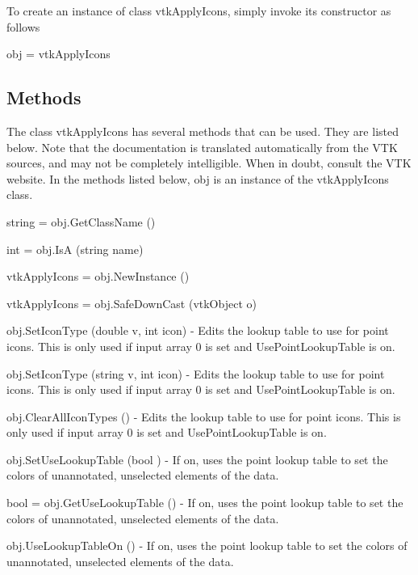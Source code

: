 To create an instance of class vtk\-Apply\-Icons, simply invoke its constructor as follows \begin{DoxyVerb}  obj = vtkApplyIcons
\end{DoxyVerb}
 \hypertarget{vtkwidgets_vtkxyplotwidget_Methods}{}\subsection{Methods}\label{vtkwidgets_vtkxyplotwidget_Methods}
The class vtk\-Apply\-Icons has several methods that can be used. They are listed below. Note that the documentation is translated automatically from the V\-T\-K sources, and may not be completely intelligible. When in doubt, consult the V\-T\-K website. In the methods listed below, {\ttfamily obj} is an instance of the vtk\-Apply\-Icons class. 
\begin{DoxyItemize}
\item {\ttfamily string = obj.\-Get\-Class\-Name ()}  
\item {\ttfamily int = obj.\-Is\-A (string name)}  
\item {\ttfamily vtk\-Apply\-Icons = obj.\-New\-Instance ()}  
\item {\ttfamily vtk\-Apply\-Icons = obj.\-Safe\-Down\-Cast (vtk\-Object o)}  
\item {\ttfamily obj.\-Set\-Icon\-Type (double v, int icon)} -\/ Edits the lookup table to use for point icons. This is only used if input array 0 is set and Use\-Point\-Lookup\-Table is on.  
\item {\ttfamily obj.\-Set\-Icon\-Type (string v, int icon)} -\/ Edits the lookup table to use for point icons. This is only used if input array 0 is set and Use\-Point\-Lookup\-Table is on.  
\item {\ttfamily obj.\-Clear\-All\-Icon\-Types ()} -\/ Edits the lookup table to use for point icons. This is only used if input array 0 is set and Use\-Point\-Lookup\-Table is on.  
\item {\ttfamily obj.\-Set\-Use\-Lookup\-Table (bool )} -\/ If on, uses the point lookup table to set the colors of unannotated, unselected elements of the data.  
\item {\ttfamily bool = obj.\-Get\-Use\-Lookup\-Table ()} -\/ If on, uses the point lookup table to set the colors of unannotated, unselected elements of the data.  
\item {\ttfamily obj.\-Use\-Lookup\-Table\-On ()} -\/ If on, uses the point lookup table to set the colors of unannotated, unselected elements of the data.  

\end{DoxyItemize}
